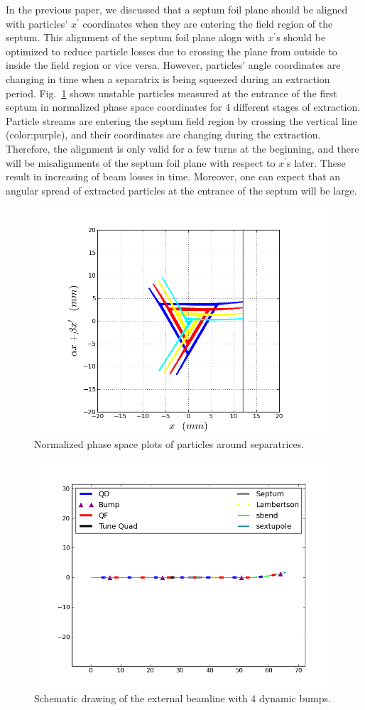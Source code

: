 \documentclass[aps,prstab,onecolumn,preprint,nofootinbib]{revtex4-1}
\begin{document}
In the previous paper, we discussed that a septum foil plane should be aligned with particles' $x^{\prime}$ coordinates when they are entering the field region of the septum. This alignment of the septum foil plane alogn with $x^{\prime}$s should be optimized to reduce particle losses due to crossing the plane from outside to inside the field region or vice versa. However, particles' angle coordinates are changing in time when a separatrix is being squeezed during an extraction period. 
Fig.~\ref{fig:bump0} shows unstable particles measured at the entrance of the first septum in normalized phase space coordinates for 4 different stages of extraction. Particle streams are entering the septum field region by crossing the vertical line (color:purple), and their coordinates are changing during the extraction.
Therefore, the alignment is only valid for a few turns at the beginning, and there will be misalignments of the septum foil plane with respect to $x^{\prime}$s later. These result in increasing of beam losses in time. Moreover, one can expect that an angular spread of extracted particles at the entrance of the septum will be large.

\begin{figure}[tbh!]
  \begin{center}
    \includegraphics[width=.45\textwidth]{img/ufp.png}
    \caption{\label{fig:bump0}Normalized phase space plots of particles around separatrices.}
  \end{center}
\end{figure}



\begin{figure}[tbh!]
  \begin{center}
    \includegraphics[width=.45\textwidth]{img/20140109-00.png}
    \caption{\label{fig:bump1}Schematic drawing of the external beamline with 4 dynamic bumps.}
  \end{center}
\end{figure}
\end{document}

